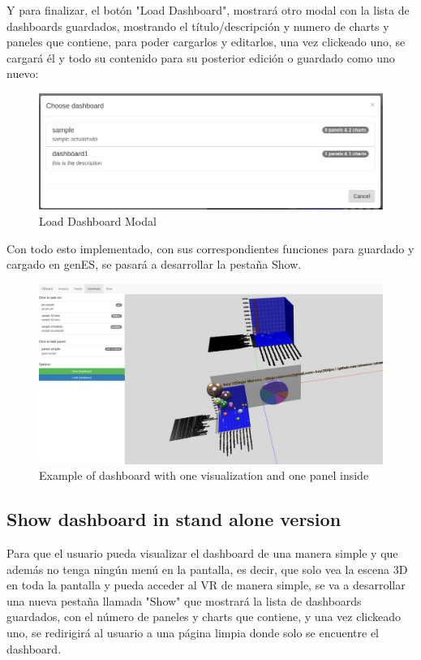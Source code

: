 \documentclass[a4paper, 12pt]{book}
\begin{document}
Y para finalizar, el botón "Load Dashboard", mostrará otro modal con la lista de dashboards guardados, mostrando el título/descripción y numero de charts y paneles que contiene, para poder cargarlos y editarlos, una vez clickeado uno, se cargará él y todo su contenido para su posterior edición o guardado como uno nuevo:

\begin{figure}[H]
  \centering
  \includegraphics[width=16cm, keepaspectratio]{img/development/exampleloaddash}
  \caption{Load Dashboard Modal}
  \label{fig:exampleloaddash}
\end{figure}

Con todo esto implementado, con sus correspondientes funciones para guardado y cargado en genES, se pasará a desarrollar la pestaña Show.

\begin{figure}[H]
  \centering
  \includegraphics[width=16cm, keepaspectratio]{img/development/exampledashboard}
  \caption{Example of dashboard with one visualization and one panel inside}
  \label{fig:exampledashboard}
\end{figure}

\subsection{Show dashboard in stand alone version}

Para que el usuario pueda visualizar el dashboard de una manera simple y que además no tenga ningún menú en la pantalla, es decir, que solo vea la escena 3D en toda la pantalla y pueda acceder al VR de manera simple, se va a desarrollar una nueva pestaña llamada "Show" que mostrará la lista de dashboards guardados, con el número de paneles y charts que contiene, y una vez clickeado uno, se redirigirá al usuario a una página limpia donde solo se encuentre el dashboard.
\end{document}
